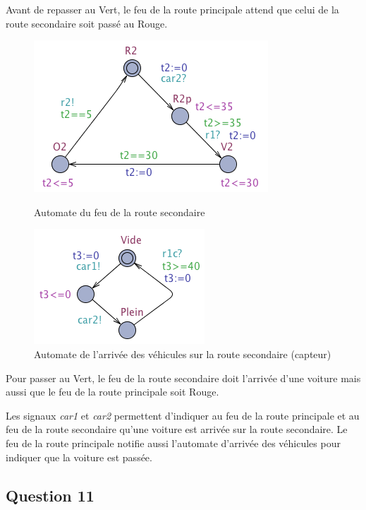 \documentclass[pdftex,12pt,a4paper]{article}
\begin{document}
Avant de repasser au Vert, le feu de la route principale attend que celui de la route secondaire soit passé au Rouge.

\begin{figure}[H]
    \begin{minipage}[c]{.46\linewidth}
		\centering
		\includegraphics[scale=0.5]{ressources/part3/Q10-2.png}
		\caption{\label{fig:minorRoadQ10}Automate du feu de la route secondaire}
    \end{minipage}
    \hfill%
    \begin{minipage}[c]{.46\linewidth}
		\centering
		\includegraphics[scale=0.5]{ressources/part3/Q10-3.png}
		\caption{\label{fig:roadSyncQ10}Automate de l'arrivée des véhicules sur la route secondaire (capteur)}
    \end{minipage}
\end{figure}

Pour passer au Vert, le feu de la route secondaire doit l'arrivée d'une voiture mais aussi que le feu de la route principale soit Rouge.

Les signaux \emph{car1} et \emph{car2} permettent d'indiquer au feu de la route principale et au feu de la route secondaire qu'une voiture est arrivée sur la route secondaire. Le feu de la route principale notifie aussi l'automate d'arrivée des véhicules pour indiquer que la voiture est passée.

\subsection{Question 11}
\end{document}

